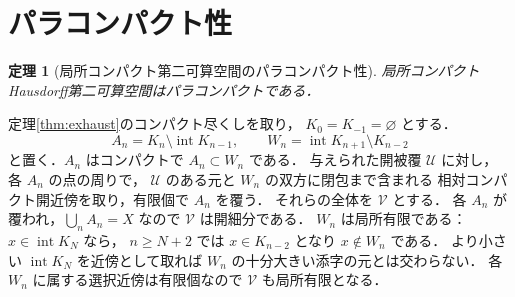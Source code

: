 \documentclass[a5paper,10pt,onecolumn]{jsarticle}
\makeatletter
\theoremstyle{mathnotetheorem}
\newtheorem{theorem}{定理}[section]
\renewcommand{\proofname}{証明}
\renewenvironment{proof}[1][\proofname]{%
  \par\pushQED{\qed}\normalfont\topsep4\p@\@plus2\p@\relax
  \trivlist\item[\hskip\labelsep\bfseries #1]\ignorespaces
}{\popQED\endtrivlist\@endpefalse}
\makeatother
\begin{document}
\section{パラコンパクト性}
\begin{theorem}[局所コンパクト第二可算空間のパラコンパクト性]
\label{thm:para}
局所コンパクトHausdorff第二可算空間はパラコンパクトである．
\end{theorem}
\begin{proof}
定理\ref{thm:exhaust}のコンパクト尽くしを取り，
$K_0=K_{-1}=\varnothing$ とする．
\[
 A_n=K_n\setminus\operatorname{int}K_{n-1},
 \qquad W_n=\operatorname{int}K_{n+1}\setminus K_{n-2}
\]
と置く．$A_n$ はコンパクトで $A_n\subset W_n$ である．
与えられた開被覆 $\mathcal U$ に対し，
各 $A_n$ の点の周りで，
$\mathcal U$ のある元と $W_n$ の双方に閉包まで含まれる
相対コンパクト開近傍を取り，有限個で $A_n$ を覆う．
それらの全体を $\mathcal V$ とする．
各 $A_n$ が覆われ，$\bigcup_nA_n=X$ なので
$\mathcal V$ は開細分である．
$W_n$ は局所有限である：
$x\in\operatorname{int}K_N$ なら，
$n\ge N+2$ では $x\in K_{n-2}$ となり
$x\notin W_n$ である．
より小さい $\operatorname{int}K_N$ を近傍として取れば
$W_n$ の十分大きい添字の元とは交わらない．
各 $W_n$ に属する選択近傍は有限個なので
$\mathcal V$ も局所有限となる．
\end{proof}
\end{document}
